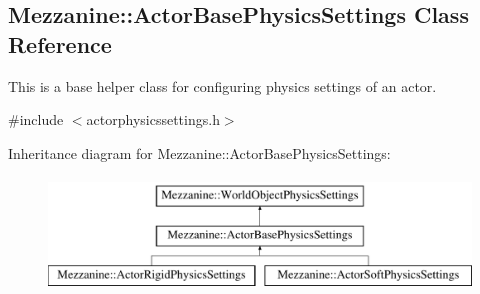 \hypertarget{classMezzanine_1_1ActorBasePhysicsSettings}{
\subsection{Mezzanine::ActorBasePhysicsSettings Class Reference}
\label{classMezzanine_1_1ActorBasePhysicsSettings}
}


This is a base helper class for configuring physics settings of an actor.  




{\ttfamily \#include $<$actorphysicssettings.h$>$}

Inheritance diagram for Mezzanine::ActorBasePhysicsSettings:\begin{figure}[H]
\begin{center}
\leavevmode
\includegraphics[height=3.000000cm]{classMezzanine_1_1ActorBasePhysicsSettings}
\end{center}
\end{figure}
